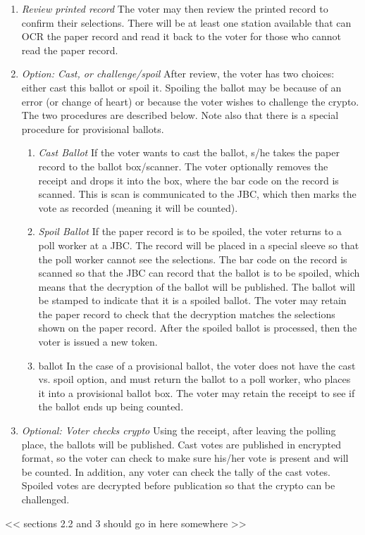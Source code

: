 \begin{enumerate}
\item {\em Review printed record}
The voter may then review the printed record to confirm their selections. There will be at least one station available that can OCR the paper record and read it back to the voter for those who cannot read the paper record.

\item {\em Option: Cast, or challenge/spoil}
After review, the voter has two choices: either cast this ballot or spoil it. Spoiling the ballot may be because of an error (or change of heart) or because the voter wishes to challenge the crypto. The two procedures are described below. Note also that there is a special procedure for provisional ballots.

\begin{enumerate}
\item  {\em Cast Ballot}
If the voter wants to cast the ballot, s/he takes the paper record to the ballot box/scanner. The voter optionally removes the receipt and drops it into the box, where the bar code on the record is scanned. This is scan is communicated to the JBC, which then marks the vote as recorded (meaning it will be counted).

\item {\em Spoil Ballot}
If the paper record is to be spoiled, the voter returns to a poll worker at a JBC. The record will be placed in a special sleeve so that the poll worker cannot see the selections. The bar code on the record is scanned so that the JBC can record that the ballot is to be spoiled, which means that the decryption of the ballot will be published. The ballot will be stamped to indicate that it is a spoiled ballot. The voter may retain the paper record to check that the decryption matches the selections shown on the paper record. After the spoiled ballot is processed, then the voter is issued a new token.

\item {\emProvisional ballot}
In the case of a provisional ballot, the voter does not have the cast vs. spoil option, and must return the ballot to a poll worker, who places it into a provisional ballot box. The voter may retain the receipt to see if the ballot ends up being counted.
\end{enumerate}

\item {\em Optional: Voter checks crypto}
Using the receipt, after leaving the polling place, the ballots will be published. Cast votes are published in encrypted format, so the voter can check to make sure his/her vote is present and will be counted. In addition, any voter can check the tally of the cast votes. Spoiled votes are decrypted before publication so that the crypto can be challenged.
\end{enumerate}

<< sections 2.2 and 3 should go in here somewhere >>

